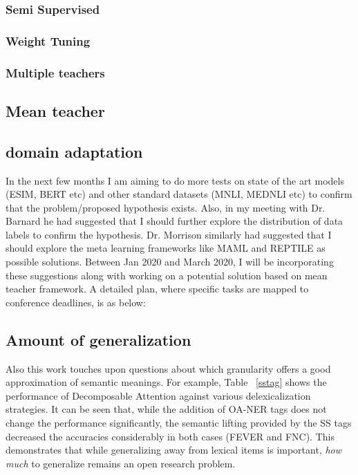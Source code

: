 \documentclass{article}
\begin{document}
\subsubsection{Semi Supervised}
\subsubsection{Weight Tuning}

\subsubsection{Multiple teachers}





\subsection{Mean teacher}

\subsection{domain adaptation }




In the next few months I am aiming to do more tests on state of the art models (ESIM, BERT etc) and other standard datasets (MNLI, MEDNLI etc)  to confirm that the problem/proposed hypothesis exists. Also, in my meeting with Dr. Barnard he had suggested that I should further explore the distribution of data labels to confirm the hypothesis. Dr. Morrison similarly had suggested that I should explore the meta learning frameworks like MAML and REPTILE as possible solutions. Between Jan 2020 and March 2020, I will be incorporating these suggestions along with working on a potential solution based on mean teacher framework. A detailed plan, where specific tasks are mapped to conference deadlines, is as below:

\subsection{Amount of generalization}
Also this work touches upon questions about which granularity offers a good approximation of semantic meanings. For example, Table ~\ref{sstag} shows the performance of Decomposable Attention against various delexicalization strategies. It can be seen that, while the addition of OA-NER tags does not change the performance significantly, the semantic lifting provided by the SS tags decreased the accuracies considerably in both cases (FEVER and FNC).  This demonstrates that while generalizing away from lexical items is important, {\em how much} to generalize remains an open research problem.
\end{document}
